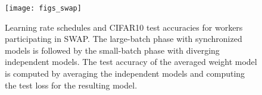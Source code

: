 \documentclass{article} %
\begin{document}
\begin{figure}[h]
	\centering
\texttt{[image: figs\_swap]} 
\vspace{-0.1in}
\caption{\small Learning rate schedules and CIFAR10 test accuracies for workers participating in SWAP. 
	The large-batch phase with synchronized models is followed by the small-batch phase with
	diverging independent models. The test accuracy of the averaged weight model is
	computed by averaging the independent models and computing the test loss for the resulting model.}
	\label{fig:swa_lr}
	\vspace{-0.2in}
\end{figure}


\end{document}
